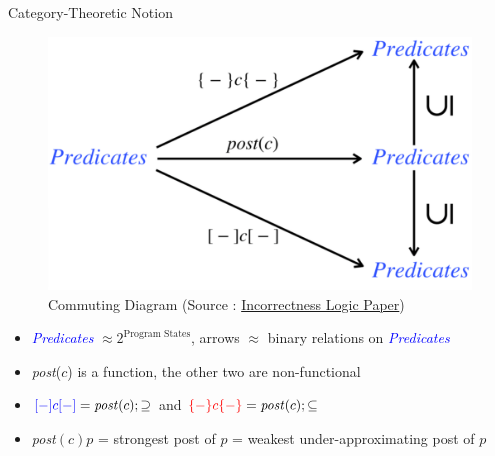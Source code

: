 \documentclass[
  10pt,
  ignorenonframetext,
]{beamer}
\begin{document}
\begin{frame}{Category-Theoretic Notion}
\label{category-theoretic-notion}
\begin{figure}
\centering
\includegraphics[width=\textwidth,height=0.4\textheight]{images/comm-diag.png}
\caption{Commuting Diagram (Source :
\href{https://dl.acm.org/doi/10.1145/3371078}{Incorrectness Logic
Paper})}
\end{figure}

\begin{itemize}
\item
  \textcolor{blue}{\emph{Predicates}}
  \(\approx 2^{\text{Program States}}\), arrows \(\approx\) binary
  relations on \textcolor{blue}{\emph{Predicates}}
\item
  \emph{post}(\(c\)) is a function, the other two are non-functional
\item
  \(\textcolor{blue}{[-]c[-]} = \text{\emph{post}}(c) ; \supseteq\) and
  \(\textcolor{red}{\{-\}c\{-\}} = \text{\emph{post}}(c) ; \subseteq\)
\item
  \emph{post}\((c)p\) = strongest post of \(p\) = weakest
  under-approximating post of \(p\)
\end{itemize}
\end{frame}
\end{document}
